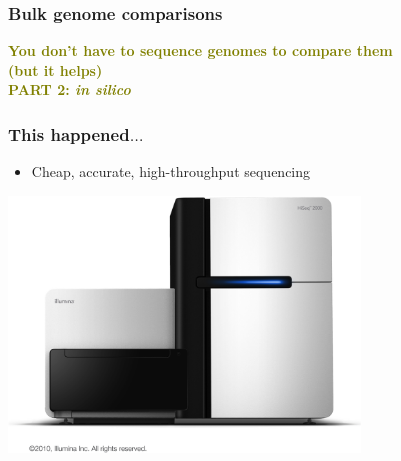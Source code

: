 
%
\begin{frame}
  \frametitle{Bulk genome comparisons}
  \Large{
    \textcolor{olive}{
      \textbf{
      You don't have to sequence genomes to compare them \\
      (but it helps) \\
      PART 2: \textit{in silico}
      }
    }
  }
\end{frame}

%
\begin{frame}
  \frametitle{This happened$\ldots$}
  \begin{itemize}
    \item Cheap, accurate, high-throughput sequencing
  \end{itemize}
  \begin{center}
    \includegraphics[width=0.7\textwidth]{images/illumina_hiseq}
  \end{center}  
\end{frame}